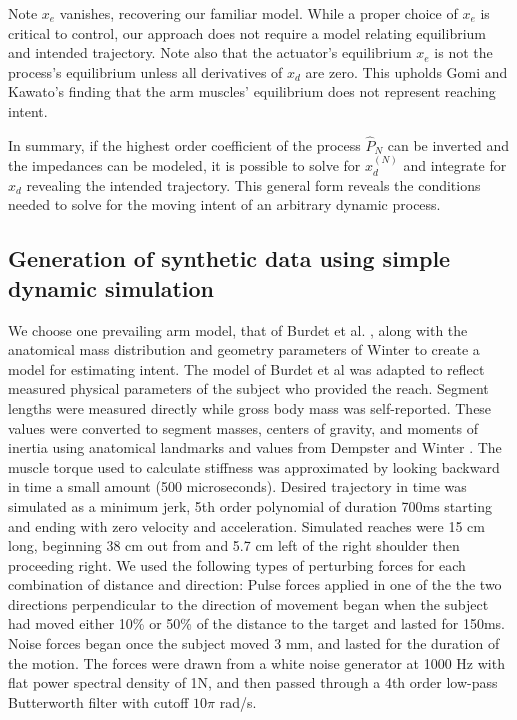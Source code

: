 \documentclass[10pt]{article}
\begin{document}
Note $x_e$ vanishes, recovering our familiar model. While a proper choice of $x_e$ is critical to control, our approach does not require a model relating equilibrium and intended trajectory. Note also that the actuator's equilibrium $x_e$ is not the process's equilibrium unless all derivatives of $x_d$ are zero. This upholds Gomi and Kawato's finding that the arm muscles' equilibrium does not represent reaching intent\cite{gomi1997human}.

In summary, if the highest order coefficient of the process $\hat{P}_N$ can be inverted and the impedances can be modeled, it is possible to solve for $x_d^{(N)}$ and integrate for $x_d$ revealing the intended trajectory. This general form reveals the conditions needed to solve for the moving intent of an arbitrary dynamic process. 

\subsection*{Generation of synthetic data using simple dynamic simulation}
We choose one prevailing arm model, that of Burdet et al. \cite{burdet2006stability}, along with the anatomical mass distribution and geometry parameters of Winter \cite{winter2009biomechanics} to create a model for estimating intent. The model of Burdet et al \cite{burdet2006stability} was adapted to reflect measured physical parameters of the subject who provided the reach. Segment lengths were measured directly while gross body mass was self-reported. These values were converted to segment masses, centers of gravity, and moments of inertia using anatomical landmarks and values from Dempster \cite{dempster1955space} and Winter \cite{winter2009biomechanics}. The muscle torque used to calculate stiffness was approximated by looking backward in time a small amount (500 microseconds). Desired trajectory in time was simulated as a minimum jerk, 5th order polynomial of duration 700ms starting and ending with zero velocity and acceleration.
Simulated reaches were 15 cm long, beginning 38 cm out from and 5.7 cm left of the right shoulder then proceeding right.  We used the following types of perturbing forces for each combination of distance and direction: 
Pulse forces applied in one of the the two directions perpendicular to the direction of movement began when the subject had moved either 10\% or 50\% of the distance to the target and lasted for 150ms.
Noise forces began once the subject moved 3 mm, and lasted for the duration of the motion. The forces were drawn from a white noise generator at 1000 Hz with flat power spectral density of 1N, and then passed through a 4th order low-pass Butterworth filter with cutoff $10\pi$ rad/s. 
\end{document}
